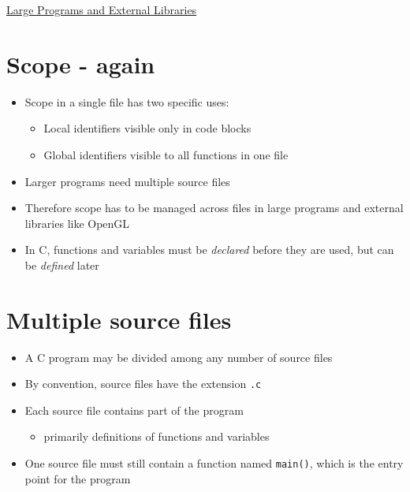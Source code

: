 \documentclass{article}
\begin{document}
\begin{center}
	\underline{\huge Large Programs and External Libraries}
\end{center}




\section{Scope - again}
\begin{itemize}
\item Scope in a single file has two specific uses:
\begin{itemize}
\item Local identifiers visible only in code blocks
\item Global identifiers visible to all functions in one file
\end{itemize}

\item Larger programs need multiple source files

\item Therefore scope has to be managed across files in large programs and external libraries like OpenGL

\item In C, functions and variables must be \emph{declared} before they are used, but can be \emph{defined} later
\end{itemize}



\section{Multiple source files}
\begin{itemize}
\item A C program may be divided among any number of source files
\item By convention, source files have the extension \verb!.c!
\item Each source file contains part of the program
\begin{itemize}
\item primarily definitions of functions and variables
\end{itemize}
\item One source file must still contain a function named \verb!main()!, which is the entry point for the program
\end{itemize}
\end{document}
